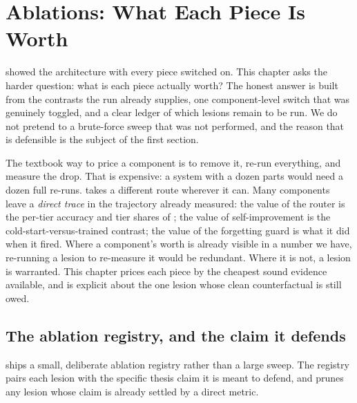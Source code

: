 \chapter{Ablations: What Each Piece Is Worth}
\label{ch:ablations}

 showed the architecture with every piece switched on. This
chapter asks the harder question: what is each piece actually worth? The honest answer
is built from the contrasts the run already supplies, one component-level switch that
was genuinely toggled, and a clear ledger of which lesions remain to be run. We do not
pretend to a brute-force sweep that was not performed, and the reason that is
defensible is the subject of the first section.

\begin{intuition}
The textbook way to price a component is to remove it, re-run everything, and measure
the drop. That is expensive: a system with a dozen parts would need a dozen full
re-runs. \caem{} takes a different route wherever it can. Many components leave a
\emph{direct trace} in the trajectory already measured: the value of the router is the
per-tier accuracy and tier shares of ; the value of
self-improvement is the cold-start-versus-trained contrast; the value of the forgetting
guard is what it did when it fired. Where a component's worth is already visible in a
number we have, re-running a lesion to re-measure it would be redundant. Where it is
not, a lesion is warranted. This chapter prices each piece by the cheapest sound
evidence available, and is explicit about the one lesion whose clean counterfactual is
still owed.
\end{intuition}

\section{The ablation registry, and the claim it defends}
\label{sec:abl-registry}

\caem{} ships a small, deliberate ablation registry rather than a large sweep. The
registry pairs each lesion with the specific thesis claim it is meant to defend, and
prunes any lesion whose claim is already settled by a direct metric.

